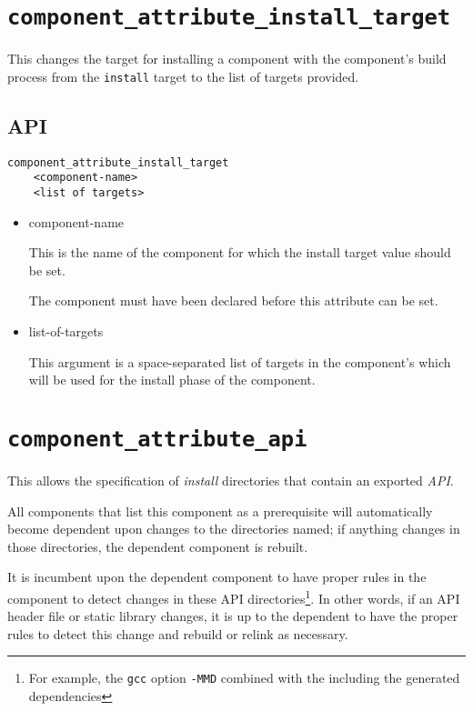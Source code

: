 \section{\texttt{component\_attribute\_install\_target}}\label{api:component-attribute-install-target}

This changes the target for installing a component with the
component's build process from the \texttt{install} \make target to
the list of targets provided.

\subsection{API}

\begin{verbatim}
component_attribute_install_target
    <component-name>
    <list of targets>
\end{verbatim}

\begin{itemize}
\item component-name

  This is the name of the component for which the install target value
  should be set.

  The component must have been declared before this attribute can be
  set.

\item list-of-targets

  This argument is a space-separated list of targets in the
  component's \makefile which will be used for the install phase of
  the component.
\end{itemize}

\section{\texttt{component\_attribute\_api}}\label{api:component-attribute-api}

This allows the specification of \emph{install} directories that
contain an exported \emph{API}.

All components that list this component as a prerequisite will
automatically become dependent upon changes to the directories named;
if anything changes in those directories, the dependent component is
rebuilt.

It is incumbent upon the dependent component to have proper rules in
the component \makefile to detect changes in these API
directories\footnote{For example, the \texttt{gcc} option
  \texttt{-MMD} combined with the \makefile including the generated
  dependencies}.  In other words, if an API header file or static
library changes, it is up to the dependent \makefile to have the
proper rules to detect this change and rebuild or relink as necessary.

